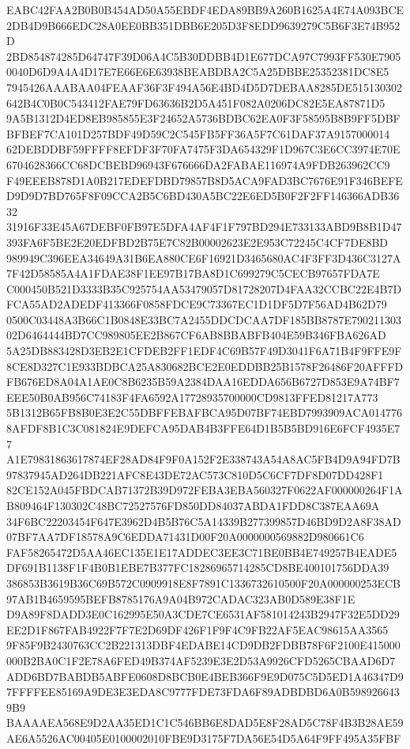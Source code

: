 \documentclass[UTF8,fontset=fandol,zihao=-4,a4paper]{ctexart}
\begin{document}
{{EABC42FAA2B0B0B454AD50A55EBDF4EDA89BB9A260B1625A4E74A093BCE2DB4D9B666EDC28A0EE0BB351DBB6E205D3F8EDD9639279C5B6F3E74B952D
2BD854874285D64747F39D06A4C5B30DDBB4D1E677DCA97C7993FF530E79050040D6D9A4A4D17E7E66E6E63938BEABDBA2C5A25DBBE25352381DC8E5
7945426AAABAA04FEAAF36F3F494A56E4BD4D5D7DEBAA8285DE515130302642B4C0B0C543412FAE79FD63636B2D5A451F082A0206DC82E5EA87871D5
9A5B1312D4ED8EB985855E3F24652A5736BDBC62EA0F3F58595B8B9FF5DBFBFBEF7CA101D257BDF49D59C2C545FB5FF36A5F7C61DAF37A9157000014
62DEBDDBF59FFFF8EFDF3F70FA7475F3DA654329F1D967C3E6CC3974E70E6704628366CC68DCBEBD96943F676666DA2FABAE116974A9FDB263962CC9
F49EEEB878D1A0B217EDEFDBD79857B8D5ACA9FAD3BC7676E91F346BEFED9D9D7BD765F8F09CCA2B5C6BD430A5BC22E6ED5B0F2F2FF146366ADB3632
31916F33E45A67DEBF0FB97E5DFA4AF4F1F797BD294E733133ABD9B8B1D47393FA6F5BE2E20EDFBD2B75E7C82B00002623E2E953C72245C4CF7DE8BD
989949C396EEA34649A31B6EA880CE6F16921D3465680AC4F3FF3D436C3127A7F42D58585A4A1FDAE38F1EE97B17BA8D1C699279C5CECB97657FDA7E
C000450B521D3333B35C925754AA53479057D81728207D4FAA32CCBC22E4B7DFCA55AD2ADEDF413366F0858FDCE9C73367EC1D1DF5D7F56AD4B62D79
0500C03448A3B66C1B0848E33BC7A2455DDCDCAA7DF185BB8787E79021130302D6464444BD7CC989805EE2B867CF6AB8BBABFB404E59B346FBA626AD
5A25DB883428D3EB2E1CFDEB2FF1EDF4C69B57F49D3041F6A71B4F9FFE9F8CE8D327C1E933BDBCA25A830682BCE2E0EDDBB25B1578F26486F20AFFFD
FB676ED8A04A1AE0C8B6235B59A2384DAA16EDDA656B6727D853E9A74BF7EEE50B0AB956C74183F4FA6592A17728935700000CD9813FFED81217A773
5B1312B65FB8B0E3E2C55DBFFEBAFBCA95D07BF74EBD7993909ACA0147768AFDF8B1C3C081824E9DEFCA95DAB4B3FFE64D1B5B5BD916E6FCF4935E77
A1E79831863617874EF28AD84F9F0A152F2E338743A54A8AC5FB4D9A94FD7B97837945AD264DB221AFC8E43DE72AC573C810D5C6CF7DF8D07DD428F1
82CE152A045FBDCAB71372B39D972FEBA3EBA560327F0622AF000000264F1AB809464F130302C48BC72527576FD850DD84037ABDA1FDD8C387EAA69A
34F6BC22203454F647E3962D4B5B76C5A14339B277399857D46BD9D2A8F38AD07BF7AA7DF18578A9C6EDDA71431D00F20A0000000569882D980661C6
FAF58265472D5AA46EC135E1E17ADDEC3EE3C71BE0BB4E749257B4EADE5DF691B1138F1F4B0B1EBE7B377FC18286965714285CD8BE400101756DDA39
386853B3619B36C69B572C0909918E8F7891C1336732610500F20A000000253ECB97AB1B4659595BEFB8785176A9A04B972CADAC323AB0D589E38F1E
D9A89F8DADD3E0C162995E50A3CDE7CE6531AF581014243B2947F32E5DD29EE2D1F867FAB4922F7F7E2D69DF426F1F9F4C9FB22AF5EAC98615AA3565
9F85F9B2430763CC2B221313DBF4EDABE14CD9DB2FDBB78F6F2100E415000000B2BA0C1F2E78A6FED49B374AF5239E3E2D53A9926CFD5265CBAAD6D7
ADD6BD7BABDB5ABFE0608D8BCB0E4BEB366F9E9D075C5D5ED1A46347D97FFFFEE85169A9DE3E3EDA8C9777FDE73FDA6F89ADBDBD6A0B5989266439B9
BAAAAEA568E9D2AA35ED1C1C546BB6E8DAD5E8F28AD5C78F4B3B28AE59AE6A5526AC00405E0100002010FBE9D3175F7DA56E54D5A64F9FF495A35FBF
}}
\end{document}

